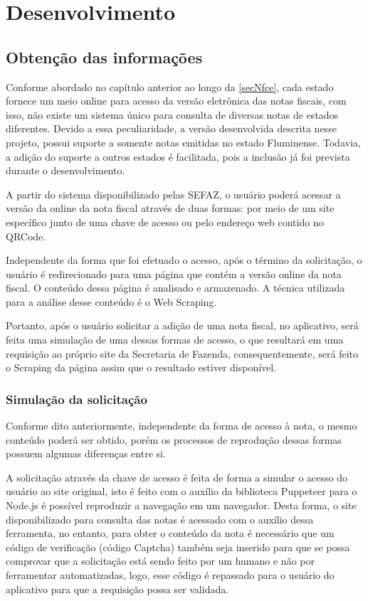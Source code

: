 \chapter{Desenvolvimento}

\section{Obtenção das informações}
\label{obtencaoInformacoes}

Conforme abordado no capítulo anterior ao longo da \autoref{secNfce}, cada estado fornece um meio online para acesso da versão eletrônica das notas fiscais, com isso, não existe um sistema único para consulta de diversas notas de estados diferentes. Devido a essa peculiaridade, a versão desenvolvida descrita nesse projeto, possui suporte a somente notas emitidas no estado Fluminense. Todavia, a adição do suporte a outros estados é facilitada, pois a inclusão já foi prevista durante o desenvolvimento.

A partir do sistema disponibilizado pelas SEFAZ, o usuário poderá acessar a versão da online da nota fiscal através de duas formas: por meio de um site específico junto de uma chave de acesso ou pelo endereço web contido no QRCode.

Independente da forma que foi efetuado o acesso, após o término da solicitação, o usuário é redirecionado para uma página que contém a versão online da nota fiscal. O conteúdo dessa página é analisado e armazenado. A técnica utilizada para a análise desse conteúdo é o Web Scraping.

Portanto, após o usuário solicitar a adição de uma nota fiscal, no aplicativo, será feita uma simulação de uma dessas formas de acesso, o que resultará em uma requisição ao próprio site da Secretaria de Fazenda, consequentemente, será feito o Scraping da página assim que o resultado estiver disponível.

\subsection{Simulação da solicitação}

Conforme dito anteriormente, independente da forma de acesso à nota, o mesmo conteúdo poderá ser obtido, porém os processos de reprodução dessas formas possuem algumas diferenças entre si.

A solicitação através da chave de acesso é feita de forma a simular o acesso do usuário ao site original, isto é feito com o auxílio da biblioteca Puppeteer para o Node.js é possível reproduzir a navegação em um navegador. Desta forma, o site disponibilizado para consulta das notas é acessado com o auxílio dessa ferramenta, no entanto, para obter o conteúdo da nota é necessário que um código de verificação (código Captcha) também seja inserido para que se possa comprovar que a solicitação está sendo feito por um humano e não por ferramentar automatizadas, logo, esse código é repassado para o usuário do aplicativo para que a requisição possa ser validada.

